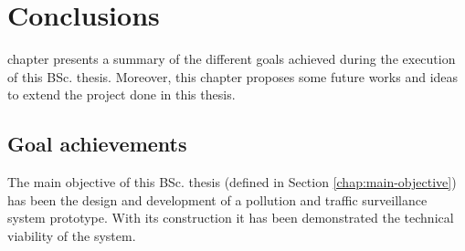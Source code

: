 \chapter{Conclusions} %
\label{chap:conclusions} 

 chapter presents a summary of the different goals achieved during the execution of this \ac{BSc.} thesis. Moreover, this chapter proposes some future works and ideas to extend the project done in this thesis.


\section{Goal achievements}

The main objective of this \ac{BSc.} thesis (defined in Section \ref{chap:main-objective}) has been the design and development of a pollution and traffic surveillance system prototype. With its construction it has been demonstrated the technical viability of the system.

